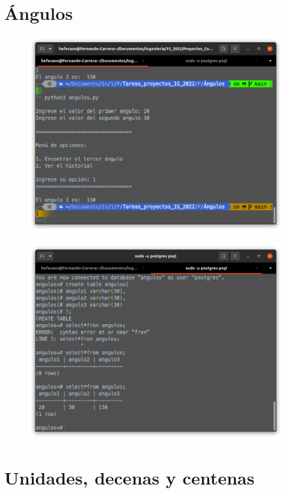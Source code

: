 \documentclass[12pt,letterpaper]{article}
\begin{document}
\begin{multicols}{2}
\section{Ángulos}

\begin{figure}[H]
\centering
\includegraphics[width = \columnwidth]{2-1.png}
\end{figure}


\begin{figure}[H]
\centering
\includegraphics[width = \columnwidth]{2-2.png}
\end{figure}



\section{Unidades, decenas y centenas}



\end{multicols}
\end{document}
